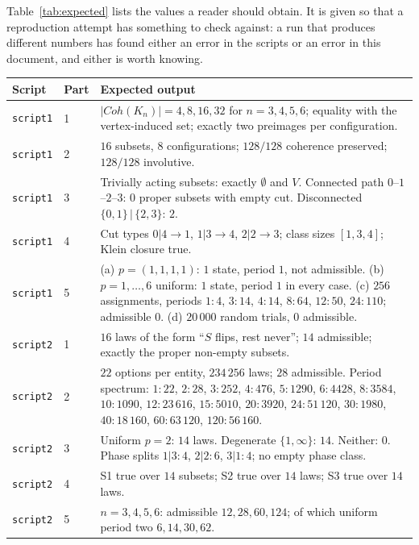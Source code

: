 \documentclass[11pt,a4paper]{article}
\def\mathrm#1{#1}%
\newcommand{\Kn}{K_n}
\newcommand{\Coh}{\mathrm{Coh}}
\begin{document}
Table~\ref{tab:expected} lists the values a reader should obtain. It is given so that a reproduction attempt has something to check against: a run that produces different numbers has found either an error in the scripts or an error in this document, and either is worth knowing.

\begin{longtable}{p{2.1cm}p{2.0cm}p{9.8cm}}
\toprule
\textbf{Script} & \textbf{Part} & \textbf{Expected output} \\
\midrule
\endhead
\texttt{script1} & 1 & $|\Coh(\Kn)|=4,8,16,32$ for $n=3,4,5,6$; equality with the vertex-induced set; exactly two preimages per configuration. \\
\texttt{script1} & 2 & $16$ subsets, $8$ configurations; $128/128$ coherence preserved; $128/128$ involutive. \\
\texttt{script1} & 3 & Trivially acting subsets: exactly $\emptyset$ and $V$. Connected path $0$--$1$--$2$--$3$: $0$ proper subsets with empty cut. Disconnected $\{0,1\}\,|\,\{2,3\}$: $2$. \\
\texttt{script1} & 4 & Cut types $0|4\to1$, $1|3\to4$, $2|2\to3$; class sizes $[1,3,4]$; Klein closure true. \\
\texttt{script1} & 5 & (a) $p=(1,1,1,1)$: $1$ state, period $1$, not admissible. (b) $p=1,\dots,6$ uniform: $1$ state, period $1$ in every case. (c) $256$ assignments, periods $1{:}4$, $3{:}14$, $4{:}14$, $8{:}64$, $12{:}50$, $24{:}110$; admissible $0$. (d) $20\,000$ random trials, $0$ admissible. \\
\midrule
\texttt{script2} & 1 & $16$ laws of the form ``$S$ flips, rest never''; $14$ admissible; exactly the proper non-empty subsets. \\
\texttt{script2} & 2 & $22$ options per entity, $234\,256$ laws; $28$ admissible. Period spectrum: $1{:}22$, $2{:}28$, $3{:}252$, $4{:}476$, $5{:}1290$, $6{:}4428$, $8{:}3584$, $10{:}1090$, $12{:}23\,616$, $15{:}5010$, $20{:}3920$, $24{:}51\,120$, $30{:}1980$, $40{:}18\,160$, $60{:}63\,120$, $120{:}56\,160$. \\
\texttt{script2} & 3 & Uniform $p=2$: $14$ laws. Degenerate $\{1,\infty\}$: $14$. Neither: $0$. Phase splits $1|3{:}4$, $2|2{:}6$, $3|1{:}4$; no empty phase class. \\
\texttt{script2} & 4 & S1 true over $14$ subsets; S2 true over $14$ laws; S3 true over $14$ laws. \\
\texttt{script2} & 5 & $n=3,4,5,6$: admissible $12,28,60,124$; of which uniform period two $6,14,30,62$. \\

\end{longtable}
\end{document}
